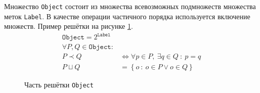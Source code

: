 Множество \texttt{Object} состоит из множества всевозможных
подмножеств множества меток \texttt{Label}. В качестве операции
частичного порядка используется включение множеств. Пример решётки на
рисунке \ref{fig:object}.
\begin{align*}
  \mathtt{Object} = 2^\mathtt{Label} \\
  \forall  P,Q \in \mathtt{Object}: & \\
  P \prec Q &\Leftrightarrow \forall p \in P,\ \exists q \in Q\ :\ p = q \\
  P \sqcup Q &= \left\{ o\ :\ o \in P  \lor o \in Q \right\}
\end{align*}%
\begin{figure}[htp]
\centering
{}
\caption{Часть решётки \texttt{Object}}
\label{fig:object}
\end{figure}%

